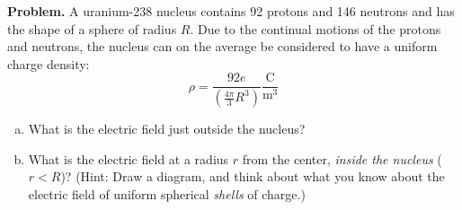\documentclass{article}
\begin{document}
\insertTitle

\textbf{Problem.} A uranium-238 nucleus contains 92 protons and 146 neutrons and has the shape of a sphere of radius $R$. Due to the continual motions of the protons and neutrons, the nucleus can on the average be considered to have a uniform charge density:
\[
    \rho = \frac{92e}{\left(\frac{4\pi}{3}R^3\right)} \frac{\text{C}}{\text{m}^3}
\]
\begin{enumerate}[(a)]
    \item What is the electric field just outside the nucleus?
    \item What is the electric field at a radius $r$ from the center, \textit{inside the nucleus} ($r<R$)? (Hint: Draw a diagram, and think about what you know about the electric field of uniform spherical \textit{shells} of charge.)
\end{enumerate}
\end{document}
